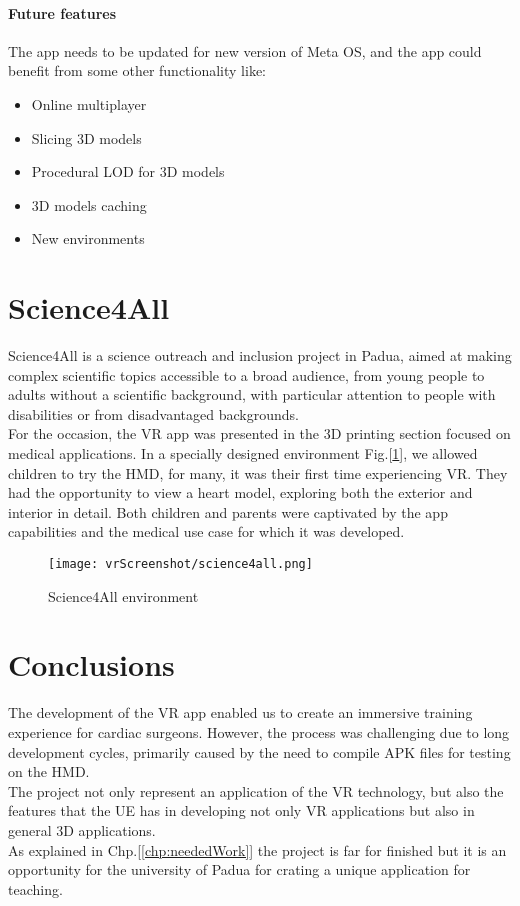 \paragraph{Future features}
The app needs to be updated for new version of Meta OS, and the app could benefit from some other functionality like:

\begin{itemize}
  \item Online multiplayer
  \item	Slicing 3D models
  \item Procedural \ac{LOD} for 3D models
  \item	3D models caching 
  \item	New environments
\end{itemize}

\section{Science4All}
\noindent
Science4All is a science outreach and inclusion project in Padua, aimed at making complex scientific topics accessible to a broad audience,
from young people to adults without a scientific background, with particular attention to people with disabilities or from disadvantaged backgrounds.\\
For the occasion, the \ac{VR} app was presented in the 3D printing section focused on medical applications. In a specially designed environment Fig.[\ref{fig:science4all}], we allowed children to try the \ac{HMD}, for many, it was their first time experiencing \ac{VR}. They had the opportunity to view a heart model, exploring both the exterior and interior in detail.
Both children and parents were captivated by the app capabilities and the medical use case for which it was developed.

\begin{figure}[ht]
  \centering
  \texttt{[image: vrScreenshot/science4all.png]}
  \caption{Science4All environment}
  \label{fig:science4all}
\end{figure}

\section{Conclusions}
\noindent
The development of the \ac{VR} app enabled us to create an immersive training experience for cardiac surgeons.
However, the process was challenging due to long development cycles, primarily caused by the need to compile \ac{APK} files for testing on the \ac{HMD}.\\
The project not only represent an application of the \ac{VR} technology, but also the features  that the \ac{UE} has in developing not only \ac{VR} applications but also in general 3D applications.\\
As explained in Chp.[\ref{chp:neededWork}] the project is far for finished but it is an opportunity for the university of Padua  for crating a unique application for teaching.\\